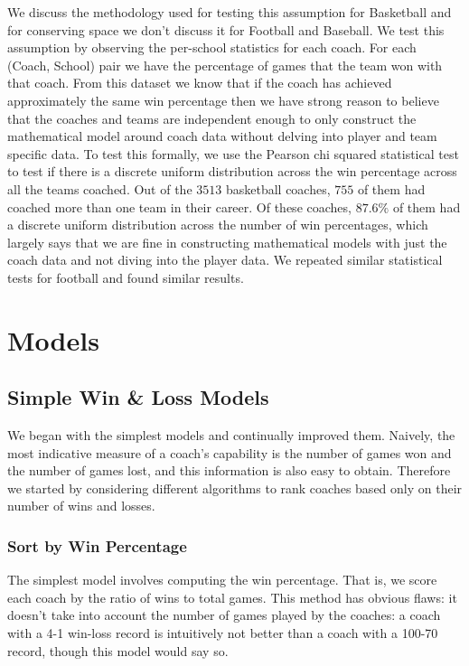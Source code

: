 \documentclass[titlepage,11pt]{article}
\begin{document}
\noindent We discuss the methodology used for testing this assumption for Basketball and for conserving space we don't discuss it for Football and Baseball. We test this assumption by observing the per-school statistics for each coach. For each (Coach, School) pair we have the percentage of games that the team won with that coach. From this dataset we know that if the coach has achieved approximately the same win percentage then we have strong reason to believe that the coaches and teams are independent enough to only construct the mathematical model around coach data without delving into player and team specific data. To test this formally, we use the Pearson chi squared statistical test to test if there is a discrete uniform distribution across the win percentage across all the teams coached. Out of the $3513$ basketball coaches, $755$ of them had coached more than one team in their career. Of these coaches, $87.6\%$ of them had a discrete uniform distribution across the number of win percentages, which largely says that we are fine in constructing mathematical models with just the coach data and not diving into the player data. We repeated similar statistical tests for football and found similar results.

\section{Models}

\subsection{Simple Win \& Loss Models}

We began with the simplest models and continually improved them. Naively, the most indicative measure of a coach's capability is the number of games won and the number of games lost, and this information is also easy to obtain. Therefore we started by considering different algorithms to rank coaches based only on their number of wins and losses.

\subsubsection{Sort by Win Percentage}
The simplest model involves computing the win percentage. That is, we score each coach by the ratio of wins to total games. This method has obvious flaws: it doesn't take into account the number of games played by the coaches: a coach with a 4-1 win-loss record is intuitively not better than a coach with a 100-70 record, though this model would say so.
\end{document}
